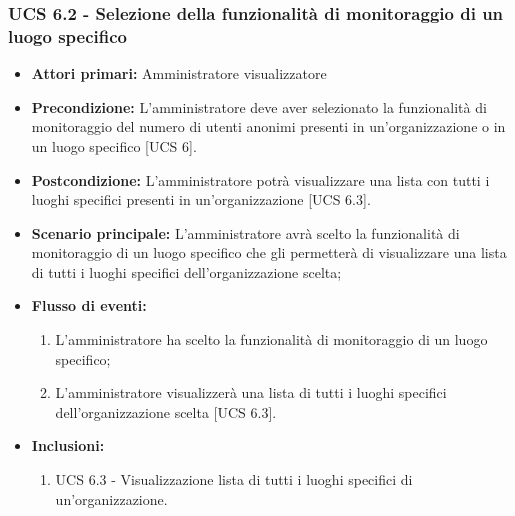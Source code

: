 \subsubsection{UCS 6.2 - Selezione della funzionalità di monitoraggio di un luogo specifico}
\begin{itemize}
	\item \textbf{Attori primari:} Amministratore visualizzatore
	\item \textbf{Precondizione:} L'amministratore deve aver selezionato la funzionalità di monitoraggio del numero di utenti anonimi presenti in un'organizzazione o in un luogo specifico [UCS 6].
	\item \textbf{Postcondizione:} L'amministratore potrà visualizzare una lista con tutti i luoghi specifici presenti in un'organizzazione [UCS 6.3].
	\item \textbf{Scenario principale:} L'amministratore avrà scelto la funzionalità di monitoraggio di un luogo specifico che gli permetterà di visualizzare una lista di tutti i luoghi specifici dell'organizzazione scelta;
	\item \textbf{Flusso di eventi:} 
	\begin{enumerate}
		\item L'amministratore ha scelto la funzionalità di monitoraggio di un luogo specifico;
		\item L'amministratore visualizzerà una lista di tutti i luoghi specifici dell'organizzazione scelta [UCS 6.3].
	\end{enumerate}
	\item \textbf{Inclusioni:}
	\begin{enumerate}
		\item UCS 6.3 - Visualizzazione lista di tutti i luoghi specifici di un'organizzazione.
	\end{enumerate}
\end{itemize}


